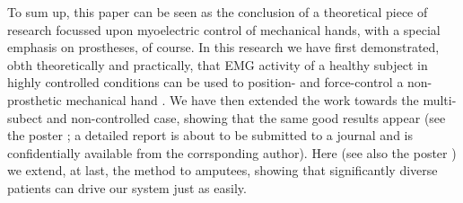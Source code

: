 To sum up, this paper can be seen as the conclusion of a theoretical
piece of research focussed upon myoelectric control of mechanical
hands, with a special emphasis on prostheses, of course. In this
research we have first demonstrated, obth theoretically and
practically, that EMG activity of a healthy subject in highly
controlled conditions can be used to position- and force-control a
non-prosthetic mechanical hand \cite{2008.ICRA,2008.BioCyb}. We have
then extended the work towards the multi-subect and non-controlled
case, showing that the same good results appear (see the poster
\cite{2008.GNB}; a detailed report is about to be submitted to a
journal and is confidentially available from the corrsponding
author). Here (see also the poster \cite{2008.Neurorob}) we extend, at
last, the method to amputees, showing that significantly diverse
patients can drive our system just as easily.
